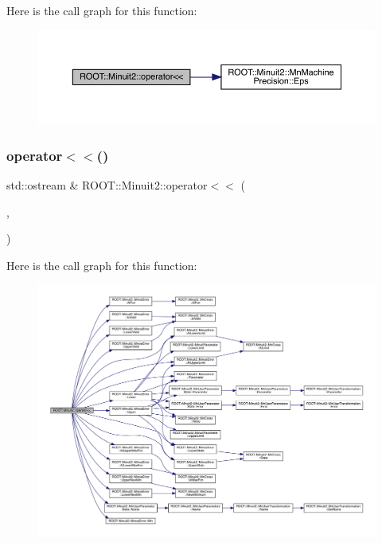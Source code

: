 Here is the call graph for this function\+:\nopagebreak
\begin{figure}[H]
\begin{center}
\leavevmode
\includegraphics[width=350pt]{d6/d3a/namespaceROOT_1_1Minuit2_a490766f2dd62363c6729e716a8da5da8_cgraph}
\end{center}
\end{figure}
\mbox{\label{namespaceROOT_1_1Minuit2_a21121467830697f28cd9d979108c44dd}} 
\subsubsection{\texorpdfstring{operator$<$$<$()}{operator<<()}\hspace{0.1cm}{\footnotesize\ttfamily [10/11]}}
{\footnotesize\ttfamily std\+::ostream \& R\+O\+O\+T\+::\+Minuit2\+::operator$<$$<$ (\begin{DoxyParamCaption}\item[{std\+::ostream \&}]{,  }\item[{const \mbox{\hyperlink{classROOT_1_1Minuit2_1_1MinosError}{Minos\+Error}} \&}]{ }\end{DoxyParamCaption})}

Here is the call graph for this function\+:\nopagebreak
\begin{figure}[H]
\begin{center}
\leavevmode
\includegraphics[width=350pt]{d6/d3a/namespaceROOT_1_1Minuit2_a21121467830697f28cd9d979108c44dd_cgraph}
\end{center}
\end{figure}
\mbox{\label{namespaceROOT_1_1Minuit2_a5f32b6f73f8b284fbc74fbf211a7b4ac}} 
